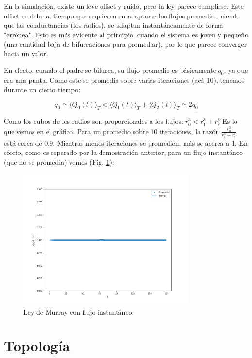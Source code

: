 \documentclass{article}
\begin{document}
En la simulación, existe un leve offset y ruido, pero la ley parece cumplirse. Este offset se debe al tiempo que requieren en adaptarse los flujos promedios, siendo que las conductancias (los radios), se adaptan instantáneamente de forma "errónea". Esto es más evidente al principio, cuando el sistema es joven y pequeño (una cantidad baja de bifurcaciones para promediar), por lo que parece converger hacia un valor.

En efecto, cuando el padre se bifurca, su flujo promedio es básicamente $q_0$, ya que era una punta. Como este se promedia sobre varias iteraciones (acá 10), tenemos durante un cierto tiempo:

$$ q_0 \simeq  \langle Q_{0}(t)\rangle_T < \langle Q_{1}(t)\rangle_T + \langle Q_{2}(t)\rangle_T \simeq 2q_0$$

Como los cubos de los radios son proporcionales a los flujos: $r_0^3 < r_1^3 + r_2^3$ Es lo que vemos en el gráfico. Para un promedio sobre 10 iteraciones, la razón $\frac{r_0^3}{r_1^3+r_2^3}$ está cerca de $0.9$. Mientras menos iteraciones se promedien, más se acerca a 1. En efecto, como es esperado por la demostración anterior, para un flujo instantáneo (que no se promedia) vemos (Fig. \ref{fig:murray_lindo}):

\begin{figure}[h!]
    \centering
    \includegraphics[width=0.8\textwidth]{graficos_inst/murray_lindo.png}
    \caption{Ley de Murray con flujo instantáneo.}
    \label{fig:murray_lindo}
\end{figure}
\newpage
\section{Topología}
\end{document}

